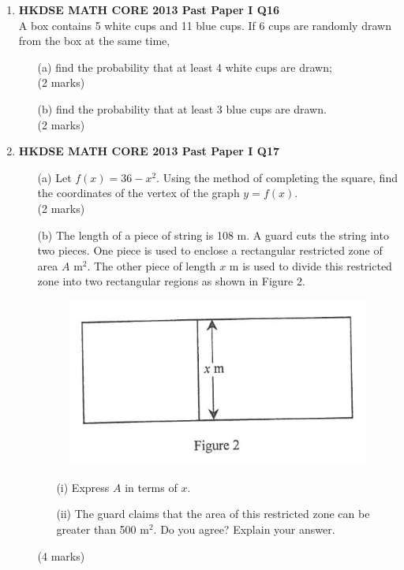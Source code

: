 \documentclass[12pt]{article}
\begin{document}
\begin{enumerate}
	\item \textbf{HKDSE MATH CORE 2013 Past Paper I Q16}\\
	A box contains 5 white cups and 11 blue cups. If 6 cups are randomly drawn from the box at the same time,
	\begin{enumerate}
		\item[(a)] find the probability that at least 4 white cups are drawn; \\(2 marks)
		\item[(b)] find the probability that at least 3 blue cups are drawn. \\(2 marks)
	\end{enumerate}

	\item \textbf{HKDSE MATH CORE 2013 Past Paper I Q17}
	\begin{enumerate}
		\item[(a)] Let $f(x) = 36 - x^2$. Using the method of completing the square, find the coordinates of the vertex of the graph $y = f(x)$. \\(2 marks)
		\item[(b)] The length of a piece of string is 108 m. A guard cuts the string into two pieces. One piece is used to enclose a rectangular restricted zone of area $A$ m$^2$. The other piece of length $x$ m is used to divide this restricted zone into two rectangular regions as shown in Figure 2.
		\begin{figure}[H]
			\centering
			\includegraphics[width = .3\linewidth]{2013Figure1.2}
		\end{figure}
		\begin{enumerate}
			\item[(i)] Express $A$ in terms of $x$.
			\item[(ii)] The guard claims that the area of this restricted zone can be greater than 500 m$^2$. Do you agree? Explain your answer.
		\end{enumerate}
		(4 marks)
	\end{enumerate}


\end{enumerate}
\end{document}
